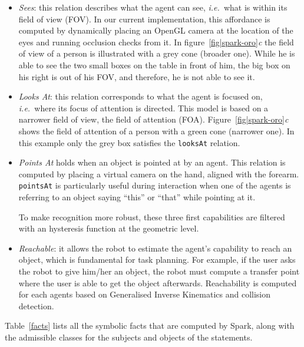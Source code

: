 \documentclass[preprint,3p,times]{elsarticle}
\newcommand{\concept}[1]{{\small \texttt{#1}}}
\newcommand{\ie}{{\textit{i.e.\ }}}
\begin{document}
\begin{itemize}

\item \emph{Sees}: this relation describes what the agent can see, \ie what is
    within its field of view (FOV). In our current implementation, this
    affordance is computed by dynamically placing an OpenGL camera at the
    location of the eyes and running occlusion checks from it.  In
    figure~\ref{fig|spark-oro}\emph{c} the field of view of a person is
    illustrated with a grey cone (broader one). While he is able to see the two
    small boxes on the table in front of him, the big box on his right is out of
    his FOV, and therefore, he is not able to see it. 

\item \emph{Looks At}: this relation corresponds to what the agent is focused
    on, \ie where its focus of attention is directed. This model is based on a
    narrower field of view, the field of attention (FOA).
    Figure~\ref{fig|spark-oro}\emph{c} shows the field of attention
    of a person with a green cone (narrower one). In this example only the grey
    box satisfies the \concept{looksAt} relation.

\item \emph{Points At} holds when an object is pointed at by an agent.
    This relation is computed by placing a virtual camera on the hand, aligned
    with the forearm. \concept{pointsAt} is particularly useful during
    interaction when one of the agents is referring to an object saying ``this''
    or ``that'' while pointing at it.

To make recognition more robust, these three first capabilities are filtered
with an hysteresis function at the geometric level.

\item \emph{Reachable}: it allows the robot to estimate the agent's capability
    to reach an object, which is fundamental for task planning. For example, if
    the user asks the robot to give him/her an object, the robot must compute a
    transfer point where the user is able to get the object afterwards.
    Reachability is computed for each agents based on Generalised Inverse
    Kinematics and collision detection.

\end{itemize}

Table~\ref{facts} lists all the symbolic facts that are computed by {\sc Spark},
along with the admissible classes for the subjects and objects of the statements.
\end{document}

